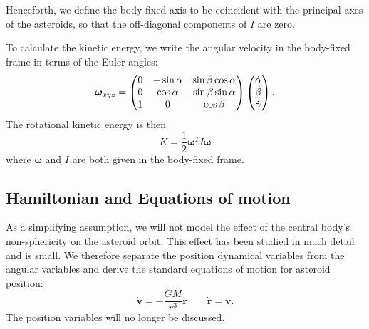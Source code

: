 \documentclass[11pt]{article}
\begin{document}
Henceforth, we define the body-fixed axis to be coincident with the principal axes of the asteroids, so that the off-diagonal components of $I$ are zero.

To calculate the kinetic energy, we write the angular velocity in the body-fixed frame in terms of the Euler angles:
\begin{equation}
\bm \omega_{xyz} = \left( \begin{matrix}
0 & -\sin \alpha & \sin \beta \cos \alpha \\
0 & \cos \alpha & \sin \beta \sin \alpha \\
1 & 0 & \cos \beta
\end{matrix} \right)
\left( \begin{matrix}
\dot \alpha\\
\dot \beta \\
\dot \gamma
\end{matrix} \right).
\label{eqn:ang-vel}
\end{equation}
The rotational kinetic energy is then
\begin{equation}
K = \frac{1}{2} \bm\omega^T I \bm \omega
\label{eqn:ke}
\end{equation}
where $\bm \omega$ and $I$ are both given in the body-fixed frame.


\subsection{Hamiltonian and Equations of motion}
As a simplifying assumption, we will not model the effect of the central body's non-sphericity on the asteroid orbit. This effect has been studied in much detail and is small. We therefore separate the position dynamical variables from the angular variables and derive the standard equations of motion for asteroid position:
\begin{equation}
\dot{\bm{v}} = -\frac{GM}{r^3}\bm{r}\qquad \dot{\bm{r}} = \bm{v}.
\end{equation}
The position variables will no longer be discussed.
\end{document}
